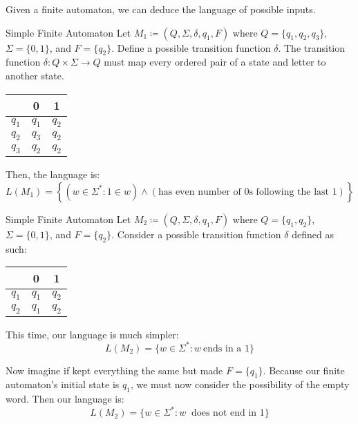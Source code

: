\documentclass[12pt]{report}
\begin{document}
Given a finite automaton, we can deduce the language of possible inputs.

\begin{exbox}{Simple Finite Automaton}{}
    Let $M_1 \coloneq (Q, \Sigma, \delta, q_1, F)$ where $Q = \{q_1, q_2, q_3\}$, $\Sigma = \{0, 1\}$, and $F = \{q_2\}$. Define a possible transition function $\delta$.
    \tcblower
    The transition function $\delta : Q \times \Sigma \to Q$ must map every ordered pair of a state and letter to another state.

    \begin{center}\begin{tabular}{c | c | c }
        & 0 & 1 \\ \hline
        $q_1$ & $q_1$ & $q_2$ \\
        $q_2$ & $q_3$ & $q_2$ \\
        $q_3$ & $q_2$ & $q_2$
    \end{tabular}\end{center}

    Then, the language is:
    \[ L(M_1) = \left\{ (w \in \Sigma^*: 1 \in w) \land (\text{has even number of 0s following the last 1}) \right\} \]
\end{exbox}

\begin{exbox}{Simple Finite Automaton}{}
    Let $M_2 \coloneq (Q, \Sigma, \delta, q_1, F)$ where $Q = \{q_1, q_2\}$, $\Sigma = \{0, 1\}$, and $F = \{q_2\}$. Consider a possible transition function $\delta$ defined as such:

    \begin{center}\begin{tabular}{c | c | c }
        & 0 & 1 \\ \hline
        $q_1$ & $q_1$ & $q_2$ \\
        $q_2$ & $q_1$ & $q_2$ \\
    \end{tabular}\end{center}

    This time, our language is much simpler:
    \[ L(M_2) = \{ w \in \Sigma^* : w\ \text{ends in a 1} \} \]

    Now imagine if kept everything the same but made $F = \{q_1\}$. Because our finite automaton's initial state is $q_1$, we must now consider the possibility of the empty word. Then our language is:
    \[ L(M_2) = \{ w \in \Sigma^* : w\ \text{ does not end in 1} \} \]
\end{exbox}
\end{document}
